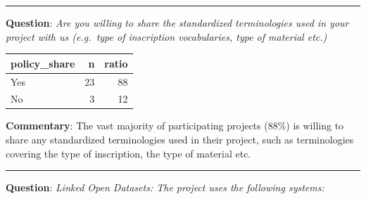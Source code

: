 \documentclass[
  12pt,
]{scrreprt}
\begin{document}
\begin{center}\rule{0.5\linewidth}{0.5pt}\end{center}

\textbf{Question}: \emph{Are you willing to share the standardized
terminologies used in your project with us (e.g.~type of inscription
vocabularies, type of material etc.)}

\footnotesize

\begin{longtable}[]{@{}lrr@{}}
\toprule
policy\_share & n & ratio \\
\midrule
\endhead
Yes & 23 & 88 \\
No & 3 & 12 \\
\bottomrule
\end{longtable}

\normalsize

\textbf{Commentary}: The vast majority of participating projects (88\%)
is willing to share any standardized terminologies used in their
project, such as terminologies covering the type of inscription, the
type of material etc.

\begin{center}\rule{0.5\linewidth}{0.5pt}\end{center}

\textbf{Question}: \emph{Linked Open Datasets: The project uses the
following systems:}

\footnotesize
\end{document}
